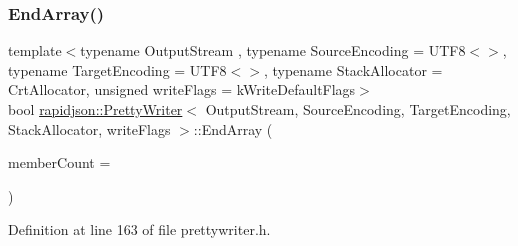 \subsubsection{\texorpdfstring{EndArray()}{EndArray()}}
{\footnotesize\ttfamily template$<$typename Output\+Stream , typename Source\+Encoding  = U\+T\+F8$<$$>$, typename Target\+Encoding  = U\+T\+F8$<$$>$, typename Stack\+Allocator  = Crt\+Allocator, unsigned write\+Flags = k\+Write\+Default\+Flags$>$ \\
bool \mbox{\hyperlink{classrapidjson_1_1_pretty_writer}{rapidjson\+::\+Pretty\+Writer}}$<$ Output\+Stream, Source\+Encoding, Target\+Encoding, Stack\+Allocator, write\+Flags $>$\+::End\+Array (\begin{DoxyParamCaption}\item[{\mbox{\hyperlink{namespacerapidjson_a44eb33eaa523e36d466b1ced64b85c84}{Size\+Type}}}]{member\+Count = {} }\end{DoxyParamCaption})}



Definition at line 163 of file prettywriter.\+h.


